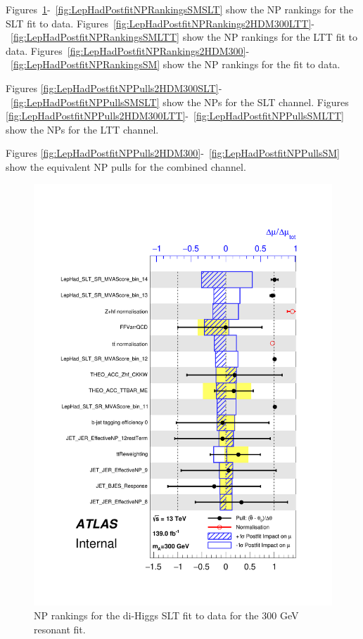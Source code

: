 Figures~\ref{fig:LepHadPostfitNPRankings2HDM300SLT}-~\ref{fig:LepHadPostfitNPRankingsSMSLT} show the NP rankings for the \lephad SLT fit to data.
Figures~\ref{fig:LepHadPostfitNPRankings2HDM300LTT}-~\ref{fig:LepHadPostfitNPRankingsSMLTT} show the NP rankings for the \lephad LTT fit to data.
Figures~\ref{fig:LepHadPostfitNPRankings2HDM300}-~\ref{fig:LepHadPostfitNPRankingsSM} show the NP rankings for the \lephad fit to data.

Figures \ref{fig:LepHadPostfitNPPulls2HDM300SLT}-~\ref{fig:LepHadPostfitNPPullsSMSLT} show the NPs for
the \lephad SLT channel.
Figures \ref{fig:LepHadPostfitNPPulls2HDM300LTT}-~\ref{fig:LepHadPostfitNPPullsSMLTT} show the NPs for
the \lephad LTT channel.



Figures \ref{fig:LepHadPostfitNPPulls2HDM300}-~\ref{fig:LepHadPostfitNPPullsSM} show the equivalent NP pulls for the combined \lephad channel.

\begin{figure}
   \centering
   \includegraphics[width=.8\textwidth]{figures/results/HH/LepHad/pulls_SigXsecOverSM_300_SLT.pdf}
   \caption{NP rankings for the di-Higgs \lephad SLT fit to data for the 300 GeV resonant fit.}
   \label{fig:LepHadPostfitNPRankings2HDM300SLT}
   \end{figure}
   

